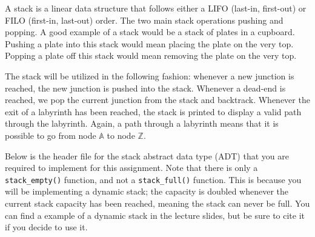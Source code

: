 \documentclass[11pt]{article}
\begin{document}
A stack is a linear data structure that follows either a LIFO
(last-in, first-out) or FILO (first-in, last-out) order. The two main stack
operations pushing and popping. A good example of a stack would be a stack of
plates in a cupboard. Pushing a plate into this stack would mean placing the
plate on the very top. Popping a plate off this stack would mean removing the
plate on the very top.

The stack will be utilized in the following fashion: whenever a new junction is
reached, the new junction is pushed into the stack. Whenever a dead-end is
reached, we pop the current junction from the stack and backtrack. Whenever the
exit of a labyrinth has been reached, the stack is printed to display a valid
path through the labyrinth. Again, a path through a labyrinth means that it is
possible to go from node $\mathbb{A}$ to node $\mathbb{Z}$.

Below is the header file for the stack abstract data type (ADT) that you are
required to implement for this assignment.  Note that there is only a
\texttt{stack\_empty()} function, and not a \texttt{stack\_full()} function.
This is because you will be implementing a dynamic stack; the capacity is
doubled whenever the current stack capacity has been reached, meaning the stack
can never be full. You can find a example of a dynamic stack in the lecture
slides, but be sure to cite it if you decide to use it.
\end{document}
